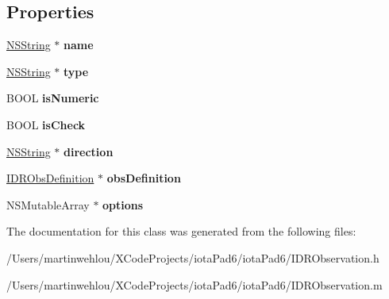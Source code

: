 \subsection*{Properties}
\begin{DoxyCompactItemize}
\item 
\hypertarget{interface_i_d_r_observation_af767ea9213345f7d762b4011537ba0a3}{
\hyperlink{class_n_s_string}{NSString} $\ast$ {\bfseries name}}
\label{interface_i_d_r_observation_af767ea9213345f7d762b4011537ba0a3}

\item 
\hypertarget{interface_i_d_r_observation_adf06a30e8c77c03940739b97d88d601d}{
\hyperlink{class_n_s_string}{NSString} $\ast$ {\bfseries type}}
\label{interface_i_d_r_observation_adf06a30e8c77c03940739b97d88d601d}

\item 
\hypertarget{interface_i_d_r_observation_a4583e8c0b55167e29575fcc3077357d5}{
BOOL {\bfseries isNumeric}}
\label{interface_i_d_r_observation_a4583e8c0b55167e29575fcc3077357d5}

\item 
\hypertarget{interface_i_d_r_observation_a23ea2fb6df59e1a44eac2d948376816a}{
BOOL {\bfseries isCheck}}
\label{interface_i_d_r_observation_a23ea2fb6df59e1a44eac2d948376816a}

\item 
\hypertarget{interface_i_d_r_observation_aea4151ab454fadcc5bbaa6f779f0ad2d}{
\hyperlink{class_n_s_string}{NSString} $\ast$ {\bfseries direction}}
\label{interface_i_d_r_observation_aea4151ab454fadcc5bbaa6f779f0ad2d}

\item 
\hypertarget{interface_i_d_r_observation_a1263e37d45829896ea7ff9ac74a64264}{
\hyperlink{interface_i_d_r_obs_definition}{IDRObsDefinition} $\ast$ {\bfseries obsDefinition}}
\label{interface_i_d_r_observation_a1263e37d45829896ea7ff9ac74a64264}

\item 
\hypertarget{interface_i_d_r_observation_a7d4cd7ae93254e7023b228be6cc4bd63}{
NSMutableArray $\ast$ {\bfseries options}}
\label{interface_i_d_r_observation_a7d4cd7ae93254e7023b228be6cc4bd63}

\end{DoxyCompactItemize}


The documentation for this class was generated from the following files:\begin{DoxyCompactItemize}
\item 
/Users/martinwehlou/XCodeProjects/iotaPad6/iotaPad6/IDRObservation.h\item 
/Users/martinwehlou/XCodeProjects/iotaPad6/iotaPad6/IDRObservation.m\end{DoxyCompactItemize}
